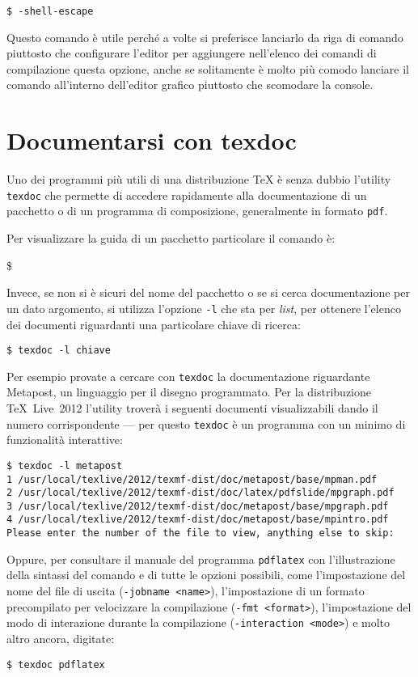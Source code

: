 \medskip
\texttt{\$  -shell-escape }
\medskip

Questo comando è utile perché a volte si preferisce lanciarlo da riga di comando piuttosto che configurare l'editor per aggiungere nell'elenco dei comandi di compilazione questa opzione, anche se solitamente è molto più comodo lanciare il comando all'interno dell'editor grafico piuttosto che scomodare la console.

\section{Documentarsi con \textsf{texdoc}}

Uno dei programmi più utili di una distribuzione \TeX{} è senza dubbio l'utility \texttt{texdoc} che permette di accedere rapidamente alla documentazione di un pacchetto o di un programma di composizione, generalmente in formato \texttt{pdf}.

Per visualizzare la guida di un pacchetto particolare il comando è:
\begin{tcolorbox}
\ttfamily
\$  
\end{tcolorbox}

Invece, se non si è sicuri del nome del pacchetto o se si cerca documentazione per un dato argomento, si utilizza l'opzione \texttt{-l} che sta per \emph{list}, per ottenere l'elenco dei documenti riguardanti una particolare chiave di ricerca:
\begin{verbatim}
$ texdoc -l chiave
\end{verbatim}

Per esempio provate a cercare con \texttt{texdoc} la documentazione riguardante Metapost, un linguaggio per il disegno programmato. Per la distribuzione \TeX{}~Live~2012 l'utility troverà i seguenti documenti visualizzabili dando il numero corrispondente --- per questo \texttt{texdoc} è un programma con un minimo di funzionalità interattive:
\begin{Verbatim}[fontsize=\small]
$ texdoc -l metapost
1 /usr/local/texlive/2012/texmf-dist/doc/metapost/base/mpman.pdf
2 /usr/local/texlive/2012/texmf-dist/doc/latex/pdfslide/mpgraph.pdf
3 /usr/local/texlive/2012/texmf-dist/doc/metapost/base/mpgraph.pdf
4 /usr/local/texlive/2012/texmf-dist/doc/metapost/base/mpintro.pdf
Please enter the number of the file to view, anything else to skip: 
\end{Verbatim}

Oppure, per consultare il manuale del programma \texttt{pdflatex} con l'illustrazione della sintassi del comando e di tutte le opzioni possibili, come l'impostazione del nome del file di uscita (\texttt{-jobname <name>}), l'impostazione di un formato precompilato per velocizzare la compilazione (\texttt{-fmt <format>}), l'impostazione del modo di interazione durante la compilazione (\texttt{-interaction <mode>}) e molto altro ancora, digitate:
\begin{verbatim}
$ texdoc pdflatex
\end{verbatim}

